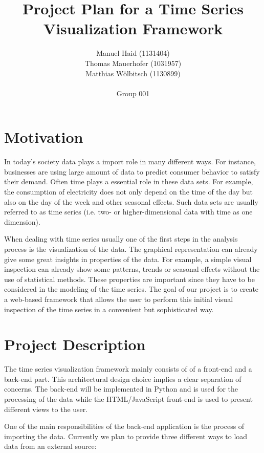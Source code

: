 \documentclass[12pt, a4paper]{article}
\author{Manuel Haid (1131404) \\ Thomas Mauerhofer (1031957) \\ Matthias Wölbitsch (1130899) \\ \\ Group 001}
\title{Project Plan for a Time Series Visualization Framework}
\date{}
\begin{document}
\maketitle


\section{Motivation}

In today's society data plays a import role in many different ways.
For instance, businesses are using large amount of data to predict consumer behavior to satisfy their demand.
Often time plays a essential role in these data sets. 
For example, the consumption of electricity does not only depend on the time of the day but also on the day of the week and other seasonal effects.
Such data sets are usually referred to as time series (i.e. two- or higher-dimensional data with time as one dimension). 

When dealing with time series usually one of the first steps in the analysis process is the visualization of the data.
The graphical representation can already give some great insights in properties of the data.
For example, a simple visual inspection can already show some patterns, trends or seasonal effects without the use of statistical methods. 
These properties are important since they have to be considered in the modeling of the time series.
The goal of our project is to create a web-based framework that allows the user to perform this initial visual inspection of the time series in a convenient but sophisticated way.


\section{Project Description}

The time series visualization framework mainly consists of of a front-end and a back-end part.
This architectural design choice implies a clear separation of concerns. 
The back-end will be implemented in Python and is used for the processing of the data while the HTML/JavaScript front-end is used to present different views to the user.

One of the main responsibilities of the back-end application is the process of importing the data.
Currently we plan to provide three different ways to load data from an external source:
\end{document}
